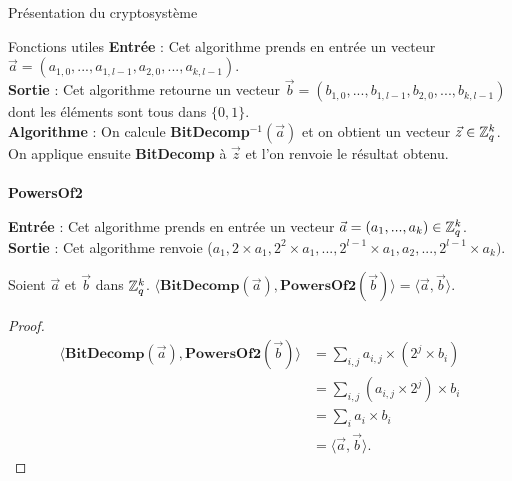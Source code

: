 \begin{section}{Présentation du cryptosystème}
\begin{subsection}{Fonctions utiles}
	\textbf{Entrée} : Cet algorithme prends en entrée un vecteur $\vec{a} = (a_{1,0}, ..., a_{1,l-1}, a_{2,0}, ..., a_{k,l-1})$. \\
	\textbf{Sortie} : Cet algorithme retourne un vecteur $\vec{b} = (b_{1,0}, ..., b_{1,l-1}, b_{2,0}, ..., b_{k,l-1})$ dont les éléments sont tous dans $\{ 0,1\} $. \\
	\textbf{Algorithme} : On calcule \textbf{BitDecomp}$^{-1}(\vec{a})$ et on obtient un vecteur $\vec{z} \in \mathbb{Z}_q^{k}$. On applique ensuite \textbf{BitDecomp} à $\vec{z}$ et l'on renvoie le résultat obtenu.
	
	\paragraph{}
	\textbf{PowersOf2}
	\flushleft

	\textbf{Entrée} : Cet algorithme prends en entrée un vecteur $\vec{a} = (a_1, ..., a_k) \in \mathbb{Z}_q^{k}$. \\
	\textbf{Sortie} : Cet algorithme renvoie ($a_1, 2\times a_1, 2^{2} \times a_1, ..., 2^{l-1} \times a_1, a_2, ..., 2^{l-1} \times a_k)$. \\
	
	\begin{prop}
	Soient $\vec{a}$ et $\vec{b}$ dans $\mathbb{Z}_q^{k}$.
	$\langle \textbf{BitDecomp}(\vec{a}), \textbf{PowersOf2}(\vec{b}) \rangle = \langle\vec{a},\vec{b} \rangle$.
	\end{prop}
	\begin{proof}
	\begin{align*}
	\langle \textbf{BitDecomp}(\vec{a}), \textbf{PowersOf2}(\vec{b}) \rangle &= \sum\limits_{i,j} a_{i,j} \times (2^{j} \times b_i) \\
	&= \sum\limits_{i,j} (a_{i,j} \times 2^{j}) \times b_i \\
	&= \sum\limits_{i} a_i \times b_i \\
	&= \langle\vec{a},\vec{b} \rangle.
	\end{align*}
	\end{proof}
	

\end{subsection}
\end{section}
